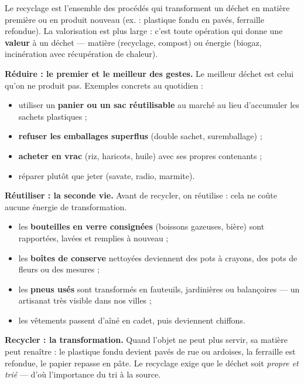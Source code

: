 \documentclass[11pt]{article}
\newcommand{\cle}[1]{{\popxbold\color{popdark}#1}}
\begin{document}
\begin{definition}
Le \cle{recyclage} est l'ensemble des procédés qui transforment un déchet en matière première ou en produit nouveau (ex. : plastique fondu en pavés, ferraille refondue).
La \cle{valorisation} est plus large : c'est toute opération qui donne une \textbf{valeur} à un déchet — matière (recyclage, compost) ou énergie (biogaz, incinération avec récupération de chaleur).
\end{definition}

\textbf{Réduire : le premier et le meilleur des gestes.} Le meilleur déchet est celui qu'on ne produit pas. Exemples concrets au quotidien :
\begin{itemize}
\item utiliser un \textbf{panier ou un sac réutilisable} au marché au lieu d'accumuler les sachets plastiques ;
\item \textbf{refuser les emballages superflus} (double sachet, suremballage) ;
\item \textbf{acheter en vrac} (riz, haricots, huile) avec ses propres contenants ;
\item réparer plutôt que jeter (savate, radio, marmite).
\end{itemize}

\textbf{Réutiliser : la seconde vie.} Avant de recycler, on réutilise : cela ne coûte aucune énergie de transformation.
\begin{itemize}
\item les \textbf{bouteilles en verre consignées} (boissons gazeuses, bière) sont rapportées, lavées et remplies à nouveau ;
\item les \textbf{boîtes de conserve} nettoyées deviennent des pots à crayons, des pots de fleurs ou des mesures ;
\item les \textbf{pneus usés} sont transformés en fauteuils, jardinières ou balançoires — un artisanat très visible dans nos villes ;
\item les vêtements passent d'aîné en cadet, puis deviennent chiffons.
\end{itemize}

\textbf{Recycler : la transformation.} Quand l'objet ne peut plus servir, sa matière peut renaître : le plastique fondu devient pavés de rue ou ardoises, la ferraille est refondue, le papier repasse en pâte. Le recyclage exige que le déchet soit \emph{propre et trié} — d'où l'importance du tri à la source.
\end{document}
